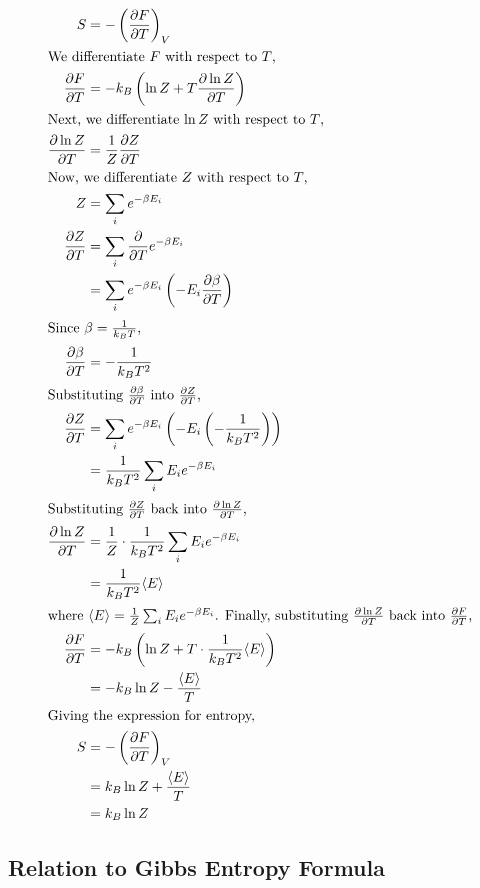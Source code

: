 \documentclass{article}
\begin{document}
\begin{align}
S &= -\left( \frac{\partial F}{\partial T} \right)_V\\
\intertext{We differentiate \( F \) with respect to \( T \),}
\frac{\partial F}{\partial T} &= -k_B \left( \ln Z + T \frac{\partial \ln Z}{\partial T} \right) \\
\intertext{Next, we differentiate \( \ln Z \) with respect to \( T \),}
\frac{\partial \ln Z}{\partial T} &= \frac{1}{Z} \frac{\partial Z}{\partial T} \\
\intertext{Now, we differentiate \( Z \) with respect to \( T \),}
Z &= \sum_i e^{-\beta E_i} \\
\frac{\partial Z}{\partial T} &= \sum_i \frac{\partial}{\partial T} e^{-\beta E_i} \\
&= \sum_i e^{-\beta E_i} \left( -E_i \frac{\partial \beta}{\partial T} \right) \\
\intertext{Since \(\beta = \frac{1}{k_B T}\),}
\frac{\partial \beta}{\partial T} &= -\frac{1}{k_B T^2} \\
\intertext{Substituting \(\frac{\partial \beta}{\partial T}\) into \(\frac{\partial Z}{\partial T}\),}
\frac{\partial Z}{\partial T} &= \sum_i e^{-\beta E_i} \left( -E_i \left( -\frac{1}{k_B T^2} \right) \right) \\
&= \frac{1}{k_B T^2} \sum_i E_i e^{-\beta E_i} \\
\intertext{Substituting \(\frac{\partial Z}{\partial T}\) back into \(\frac{\partial \ln Z}{\partial T}\),}
\frac{\partial \ln Z}{\partial T} &= \frac{1}{Z} \cdot \frac{1}{k_B T^2} \sum_i E_i e^{-\beta E_i} \\
&= \frac{1}{k_B T^2} \langle E \rangle \\
\intertext{where \( \langle E \rangle = \frac{1}{Z} \sum_i E_i e^{-\beta E_i} \). Finally, substituting \( \frac{\partial \ln Z}{\partial T} \) back into \( \frac{\partial F}{\partial T} \),}
\frac{\partial F}{\partial T} &= -k_B \left( \ln Z + T \cdot \frac{1}{k_B T^2} \langle E \rangle \right) \\
&= -k_B \ln Z - \frac{\langle E \rangle}{T} \\
\intertext{Giving the expression for entropy,}
S &= -\left( \frac{\partial F}{\partial T} \right)_V \\
&= k_B \ln Z + \frac{\langle E \rangle}{T}\\
&=k_B \ln Z
\end{align}

\subsection{Relation to Gibbs Entropy Formula}
\end{document}
